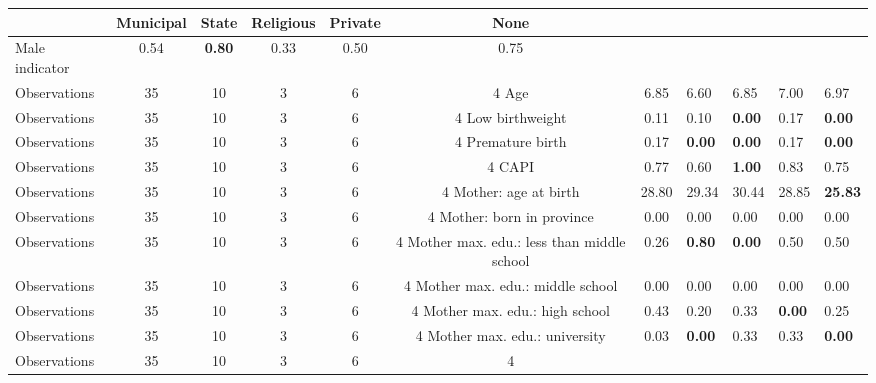 \begin{tabular}{l c c c c c c }
\toprule
& \textbf{Municipal} & \textbf{State} & \textbf{Religious} & \textbf{Private} & \textbf{None} \\
\midrule
Male indicator &      0.54 & \textbf{     0.80} &      0.33 &      0.50 &      0.75 \\
\midrule
Observations &        35 &        10 &         3 &         6 &         4
Age &      6.85 &      6.60 &      6.85 &      7.00 &      6.97 \\
\midrule
Observations &        35 &        10 &         3 &         6 &         4
Low birthweight &      0.11 &      0.10 & \textbf{     0.00} &      0.17 & \textbf{     0.00} \\
\midrule
Observations &        35 &        10 &         3 &         6 &         4
Premature birth &      0.17 & \textbf{     0.00} & \textbf{     0.00} &      0.17 & \textbf{     0.00} \\
\midrule
Observations &        35 &        10 &         3 &         6 &         4
CAPI &      0.77 &      0.60 & \textbf{     1.00} &      0.83 &      0.75 \\
\midrule
Observations &        35 &        10 &         3 &         6 &         4
Mother: age at birth &     28.80 &     29.34 &     30.44 &     28.85 & \textbf{    25.83} \\
\midrule
Observations &        35 &        10 &         3 &         6 &         4
Mother: born in province &      0.00 &      0.00 &      0.00 &      0.00 &      0.00 \\
\midrule
Observations &        35 &        10 &         3 &         6 &         4
Mother max. edu.: less than middle school &      0.26 & \textbf{     0.80} & \textbf{     0.00} &      0.50 &      0.50 \\
\midrule
Observations &        35 &        10 &         3 &         6 &         4
Mother max. edu.: middle school &      0.00 &      0.00 &      0.00 &      0.00 &      0.00 \\
\midrule
Observations &        35 &        10 &         3 &         6 &         4
Mother max. edu.: high school &      0.43 &      0.20 &      0.33 & \textbf{     0.00} &      0.25 \\
\midrule
Observations &        35 &        10 &         3 &         6 &         4
Mother max. edu.: university &      0.03 & \textbf{     0.00} &      0.33 &      0.33 & \textbf{     0.00} \\
\midrule
Observations &        35 &        10 &         3 &         6 &         4

\end{tabular}
